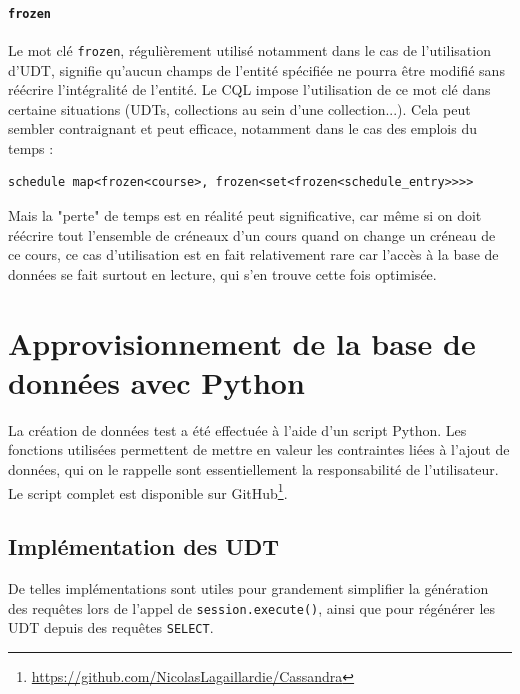 \documentclass[a4paper, 11pt]{article}
\begin{document}
\paragraph{\texttt{frozen}\\}
Le mot clé \texttt{frozen}, régulièrement utilisé notamment dans le cas de l'utilisation d'UDT, signifie qu'aucun champs de l'entité spécifiée ne pourra être modifié sans réécrire l'intégralité de l'entité. Le CQL impose l'utilisation de ce mot clé dans certaine situations (UDTs, collections au sein d'une collection...). Cela peut sembler contraignant et peut efficace, notamment dans le cas des emplois du temps :
\begin{lstlisting}
schedule map<frozen<course>, frozen<set<frozen<schedule_entry>>>>
\end{lstlisting}
Mais la "perte" de temps est en réalité peut significative, car même si on doit réécrire tout l'ensemble de créneaux d'un cours quand on change un créneau de ce cours, ce cas d'utilisation est en fait relativement rare car l'accès à la base de données se fait surtout en lecture, qui s'en trouve cette fois optimisée.

\section{Approvisionnement de la base de données avec Python}
La création de données test a été effectuée à l'aide d'un script Python. Les fonctions utilisées permettent de mettre en valeur les contraintes liées à l'ajout de données, qui on le rappelle sont essentiellement la responsabilité de l'utilisateur.\\
Le script complet est disponible sur GitHub\footnote{\url{https://github.com/NicolasLagaillardie/Cassandra}}.

\subsection{Implémentation des UDT}
De telles implémentations sont utiles pour grandement simplifier la génération des requêtes lors de l'appel de \texttt{session.execute()}, ainsi que pour régénérer les UDT depuis des requêtes \texttt{SELECT}.
\end{document}
